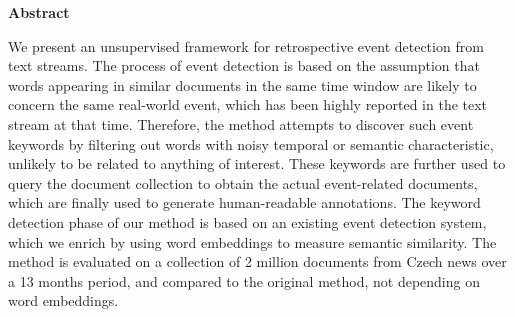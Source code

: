 \thispagestyle{plain}

\begin{center}
	\Large
	\textbf{Abstract}
\end{center}

We present an unsupervised framework for retrospective event detection from text streams. The process of event detection is based on the assumption that words appearing in similar documents in the same time window are likely to concern the same real-world event, which has been highly reported in the text stream at that time. Therefore, the method attempts to discover such event keywords by filtering out words with noisy temporal or semantic characteristic, unlikely to be related to anything of interest. These keywords are further used to query the document collection to obtain the actual event-related documents, which are finally used to generate human-readable annotations. The keyword detection phase of our method is based on an existing event detection system, which we enrich by using word embeddings to measure semantic similarity. The method is evaluated on a collection of 2 million documents from Czech news over a 13 months period, and compared to the original method, not depending on word embeddings.
